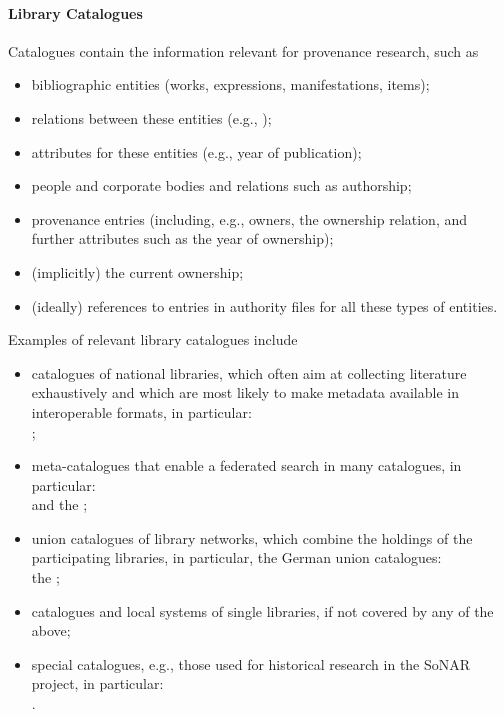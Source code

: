 \paragraph{Library Catalogues}
%
Catalogues contain the information relevant for provenance research, such as
%
\begin{itemize}
  \item
    bibliographic entities (works, expressions, manifestations, items);
  \item
    relations between these entities (e.g., );
  \item
    attributes for these entities (e.g., year of publication);
  \item
    people and corporate bodies and relations such as authorship;
  \item
    provenance entries (including, e.g., owners, the ownership relation, and further attributes such as the year of ownership);
  \item
    (implicitly) the current ownership;
  \item
    (ideally) references to entries in authority files for all these types of entities.
\end{itemize}
%
Examples of relevant library catalogues include
%
\begin{itemize}
  \item
    catalogues of national libraries, which often aim at collecting literature exhaustively
    and which are most likely to make metadata available in interoperable formats,
    in particular: \\
     \autocite{DNBCatalogue,LoCcatalogue,BLcatalogue};
  \item
    meta-catalogues that enable a federated search in many catalogues,
    in particular: \\
     and the  \autocite{WorldCat,KVK};
  \item
    union catalogues of library networks, which combine the holdings of the participating libraries,
    in particular, the German union catalogues: \\
    the  \autocite{K10plus,B3KAT,hbz,hebis};
  \item
    catalogues and local systems of single libraries, if not covered by any of the above;
  \item
    special catalogues, e.g., those used for historical research in the \gls{SoNAR} project, %
    in particular: \\
     \autocite{ZDB,KPE,ZEFYS,ExilePress}.
\end{itemize}

